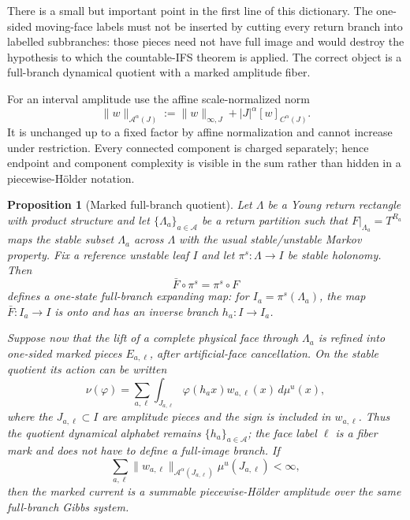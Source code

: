 \documentclass[11pt]{article}
\newtheorem{proposition}[theorem]{Proposition}
\begin{document}
There is a small but important point in the first line of this dictionary.
The one-sided moving-face labels must not be inserted by cutting every return
branch into labelled subbranches: those pieces need not have full image and
would destroy the hypothesis to which the countable-IFS theorem is applied.
The correct object is a full-branch dynamical quotient with a marked amplitude
fiber.

For an interval amplitude use the affine scale-normalized norm
\begin{equation}
\label{eq:scaled-amplitude-norm}
 \|w\|_{\mathcal A^\alpha(J)}
 :=\|w\|_{\infty,J}+|J|^\alpha[w]_{C^\alpha(J)}.
\end{equation}
It is unchanged up to a fixed factor by affine normalization and cannot
increase under restriction.  Every connected component is charged
separately; hence endpoint and component complexity is visible in the sum
rather than hidden in a piecewise-H\"older notation.

\begin{proposition}[Marked full-branch quotient]
\label{prop:marked-full-branch-quotient}
Let $\Lambda$ be a Young return rectangle with product structure and let
$\{\Lambda_a\}_{a\in\mathcal A}$ be a return partition such that
$F|_{\Lambda_a}=T^{R_a}$ maps the stable subset $\Lambda_a$ across $\Lambda$
with the usual stable/unstable Markov property.  Fix a reference unstable
leaf $I$ and let $\pi^s:\Lambda\to I$ be stable holonomy.  Then
\[
 \bar F\circ\pi^s=\pi^s\circ F
\]
defines a one-state full-branch expanding map: for
$I_a=\pi^s(\Lambda_a)$, the map $\bar F:I_a\to I$ is onto and has an inverse
branch $h_a:I\to I_a$.

Suppose now that the lift of a complete physical face through $\Lambda_a$ is
refined into one-sided marked pieces $E_{a,\ell}$, after artificial-face
cancellation.  On the stable quotient its action can be written
\begin{equation}
\label{eq:marked-amplitude-disintegration}
 \nu(\varphi)=
 \sum_{a,\ell}\int_{J_{a,\ell}}
     \varphi(h_a x)w_{a,\ell}(x)\,d\mu^u(x),
\end{equation}
where the $J_{a,\ell}\subset I$ are amplitude pieces and the sign is included
in $w_{a,\ell}$.  Thus the quotient dynamical alphabet remains
$\{h_a\}_{a\in\mathcal A}$; the face label $\ell$ is a fiber mark and does
not have to define a full-image branch.  If
\[
 \sum_{a,\ell}\|w_{a,\ell}\|_{\mathcal A^\alpha(J_{a,\ell})}
      \mu^u(J_{a,\ell})<\infty,
\]
then the marked current is a summable piecewise-H\"older amplitude over the
same full-branch Gibbs system.
\end{proposition}
\end{document}

